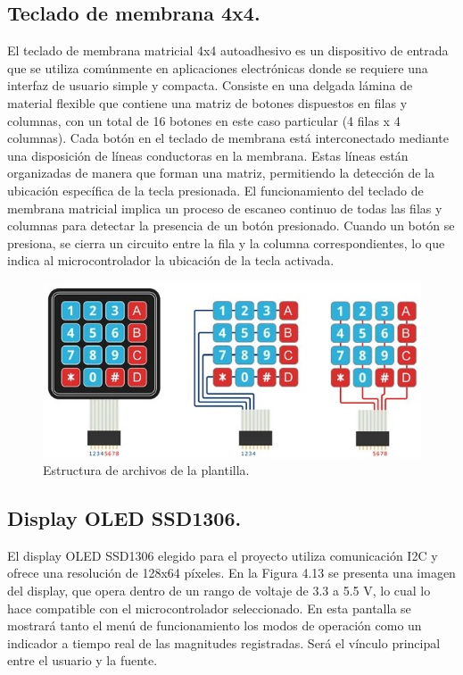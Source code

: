 \subsection{Teclado de membrana 4x4.}
El teclado de membrana matricial 4x4 autoadhesivo es un dispositivo de entrada que se utiliza comúnmente en aplicaciones electrónicas donde se requiere una interfaz de usuario simple y compacta. Consiste en una delgada lámina de material flexible que contiene una matriz de botones dispuestos en filas y columnas, con un total de 16 botones en este caso particular (4 filas x 4 columnas).
Cada botón en el teclado de membrana está interconectado mediante una disposición de líneas conductoras en la membrana. Estas líneas están organizadas de manera que forman una matriz, permitiendo la detección de la ubicación específica de la tecla presionada. El funcionamiento del teclado de membrana matricial implica un proceso de escaneo continuo de todas las filas y columnas para detectar la presencia de un botón presionado. Cuando un botón se presiona, se cierra un circuito entre la fila y la columna correspondientes, lo que indica al microcontrolador la ubicación de la tecla activada.

\begin{figure}
    \centering [H]
    \includegraphics[scale=0.5]{./imagenes/Teclado Matricial 4x4_2.jpg}
    \caption{Estructura de archivos de la plantilla.}
    \label{F:teclado4x4}
\end{figure}

\subsection{Display OLED SSD1306.}
El display OLED SSD1306 elegido para el proyecto utiliza comunicación I2C y ofrece una resolución de 128x64 píxeles. En la Figura 4.13 se presenta una imagen del display, que opera dentro de un rango de voltaje de 3.3 a 5.5 V, lo cual lo hace compatible con el microcontrolador seleccionado. En esta pantalla se mostrará tanto el menú de funcionamiento los modos de operación como un indicador a tiempo real de las magnitudes registradas. Será el vínculo principal entre el usuario y la fuente.


